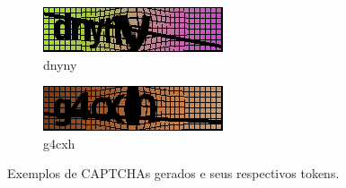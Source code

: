 \begin{figure}[ht]
	\begin{subfigure}{.5\textwidth}
		\centering
		\includegraphics[width=.9\linewidth]{figuras/12248_dnyny.png}
		\caption{dnyny}
	\end{subfigure}
	\begin{subfigure}{.5\textwidth}
		\centering
		\includegraphics[width=.9\linewidth]{figuras/8873_g4cxh.png}
		\caption{g4cxh}
	\end{subfigure}%
	\vspace{.05\linewidth}
	\caption{Exemplos de CAPTCHAs gerados e seus respectivos tokens.}
	\label{imgcaptchas}
\end{figure}


